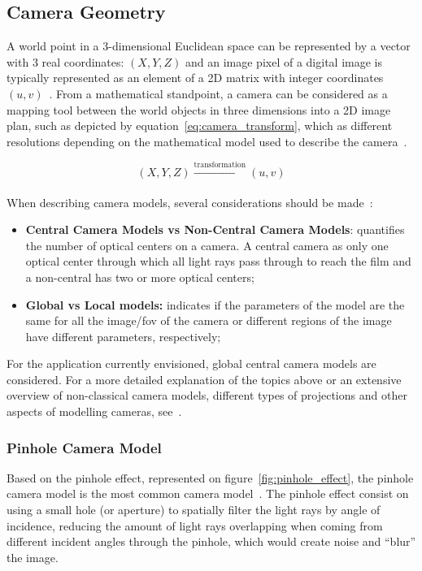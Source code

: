 \subsection{Camera Geometry}
\label{subsec:sota:camera-geometry}
A world point in a 3-dimensional Euclidean space can be represented by a vector with 3 real coordinates: $(X, Y, Z)$ and an image pixel of a digital image is typically represented as an element of a 2D matrix with integer coordinates $(u, v)$~\cite{mvg_book}. From a mathematical standpoint, a camera can be considered as a mapping tool between the world objects in three dimensions into a 2D image plan, such as depicted by equation~\ref{eq:camera_transform}, which as different resolutions depending on the mathematical model used to describe the camera~\cite{mvg_book, Sturm2010}.

\begin{equation}
	\label{eq:camera_transform}
	(X, Y, Z) \xrightarrow[]{\text{transformation}} (u, v)
\end{equation}

When describing camera models, several considerations should be made~\cite{Sturm2010}:
\begin{itemize}
	\item \textbf{Central Camera Models vs Non-Central Camera Models}: quantifies the number of optical centers on a camera. A central camera as only one optical center through which all light rays pass through to reach the film and a non-central has two or more optical centers;
	\item \textbf{Global vs Local models:} indicates if the parameters of the model are the same for all the image/\ac{fov} of the camera or different regions of the image have different parameters, respectively;
\end{itemize}

For the application currently envisioned, global central camera models are considered. For a more detailed explanation of the topics above or an extensive overview of non-classical camera models, different types of projections and other aspects of modelling cameras, see~\cite{Sturm2010, camera_models}.

\subsubsection{Pinhole Camera Model}
Based on the pinhole effect, represented on figure~\ref{fig:pinhole_effect}, the pinhole camera model is the most common camera model~\cite{camera_models}. The pinhole effect consist on using a small hole (or aperture) to spatially filter the light rays by angle of incidence, reducing the amount of light rays overlapping when coming from different incident angles through the pinhole, which would create noise and ``blur'' the image. 


